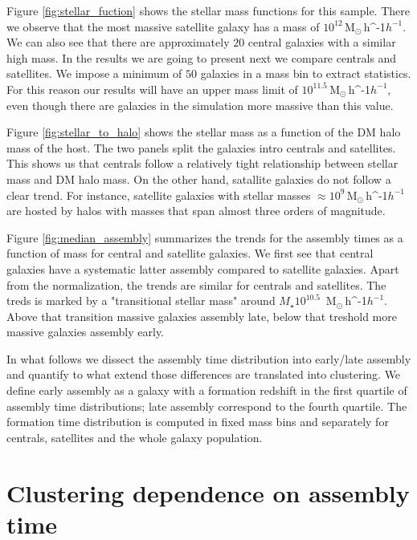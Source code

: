 \documentclass[fleqn,usenatbib]{mnras}
\newcommand{\Msunh}{\,{\rm M}$_{\odot}$\,\ifmmode h^{-1}\else $h^{-1}$\fi}
\begin{document}
Figure \ref{fig:stellar_fuction} shows the stellar mass functions for
this sample.
There we observe that the most massive satellite galaxy has a
mass of $10^{12}$\Msunh.  
We can also see that there are approximately $20$ central galaxies
with a similar high mass. 
In the results we are going to present next we compare centrals and
satellites. 
We impose a  minimum of $50$ galaxies in a mass bin to extract statistics. 
For this reason our results will have an upper mass limit of
$10^{11.5}$\Msunh, even though there are galaxies in the simulation
more massive than this value.

Figure \ref{fig:stellar_to_halo} shows the stellar mass as a function
of the DM halo mass of the host.
The two panels split the galaxies intro centrals and satellites. 
This shows us that centrals follow a relatively tight relationship
between stellar mass and DM halo mass.
On the other hand, satallite galaxies do not follow a clear trend.
For instance, satellite galaxies with stellar masses $\approx
10^{9}$\Msunh are hosted by halos with masses that span almost three
orders of magnitude.

Figure \ref{fig:median_assembly} summarizes the trends for the
assembly times as a function of mass for central and satellite
galaxies.
We first see that central galaxies have a systematic latter assembly
compared to satellite galaxies.
Apart from the normalization, the trends are similar for centrals and
satellites.
The treds is marked by a "transitional stellar mass" around 
$M_\star
10^{10.5}$ \Msunh.
Above that transition massive galaxies assembly late, below that
treshold more massive galaxies assembly early.

In what follows we dissect the assembly time distribution into
early/late assembly and quantify to what extend those differences are
translated into clustering.
We define early assembly as a galaxy with a formation redshift in the
first quartile of assembly time distributions; late
assembly correspond to the fourth quartile.
The formation time distribution is computed in fixed mass bins and
separately for centrals, satellites and the whole galaxy population. 


\section{Clustering dependence on assembly time}
\label{sec:results}
\end{document}
